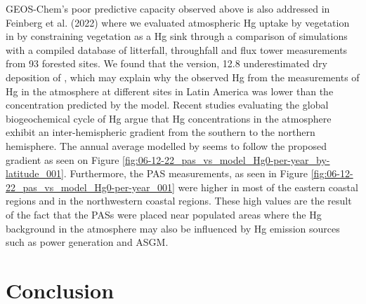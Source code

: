 \begin{flushleft}
GEOS-Chem's poor predictive capacity observed above is also addressed in Feinberg et al. (2022) where we evaluated atmospheric Hg uptake by vegetation in \gc by constraining vegetation as a Hg sink through a comparison of simulations with a compiled database of litterfall, throughfall and flux tower measurements from 93 forested sites. We found that the \gc version, 12.8  underestimated dry deposition of \hg, which may explain why the observed Hg from the measurements of Hg in the atmosphere at different sites in Latin America was lower than the concentration predicted by the model. Recent studies evaluating the global biogeochemical cycle of Hg argue that Hg concentrations in the atmosphere exhibit an inter-hemispheric gradient from the southern to the northern hemisphere. The annual average \hg modelled by \gc seems to follow the proposed gradient as seen on Figure \ref{fig:06-12-22_pas_vs_model_Hg0-per-year_by-latitude_001}. Furthermore, the PAS measurements, as seen in Figure \ref{fig:06-12-22_pas_vs_model_Hg0-per-year_001} were higher in most of the eastern coastal regions and in the northwestern coastal regions. These high values are the result of the fact that the PASs were placed near populated areas where the Hg background in the atmosphere may also be influenced by Hg emission sources such as power generation and ASGM.

\end{flushleft}











\section{Conclusion}

